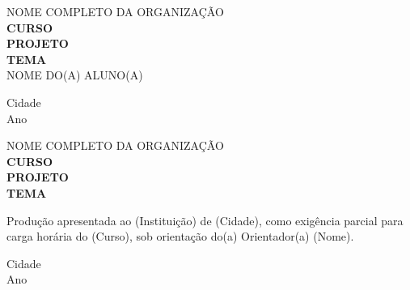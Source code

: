 \documentclass[a4paper,10pt,titlepage]{article}
\begin{document}
 

\begin{titlepage}
    \begin{justify}
        \begin{center}
            \begin{large} 
                NOME COMPLETO DA ORGANIZAÇÃO\\[1.5cm]
                \textbf{CURSO}\\[0.5cm]
                \textbf{PROJETO}\\[3cm]
                \textbf{TEMA}\\[6cm]
            
                NOME DO(A) ALUNO(A)\vfill
            
                Cidade\\[0.5cm]
                Ano\\
            \end{large}
        \end{center}
    \end{justify}
\end{titlepage}


\begin{titlepage}
    \begin{justify}
        \begin{center}
            \begin{large} 
                NOME COMPLETO DA ORGANIZAÇÃO\\[1.5cm]
                \textbf{CURSO}\\[0.5cm]
                \textbf{PROJETO}\\[3cm]
                \textbf{TEMA}\\[6cm]
            
                \hspace{.45\textwidth}
                
        \begin{flushright}        
            \begin{minipage}{.5\textwidth} 
                Produção apresentada ao (Instituição) de (Cidade), como exigência parcial para carga horária do (Curso), sob orientação do(a) Orientador(a) (Nome).
            \end{minipage}
        \end{flushright}\vfill 
        
                Cidade\\[0.5cm]
                Ano\\
            \end{large}
        \end{center}
    \end{justify}
\end{titlepage}
\end{document}
